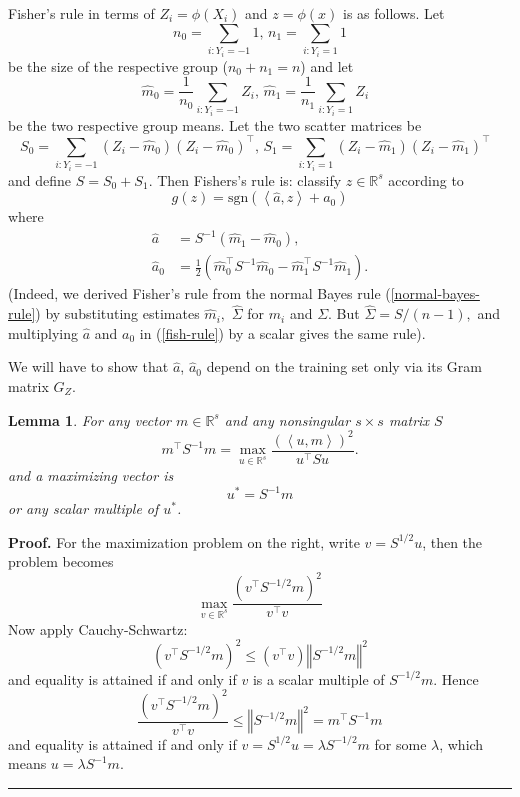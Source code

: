 \documentclass[11pt,twoside]{article}%
\theoremstyle{change}
\newtheorem{lemma}[theorem]{Lemma}
\newenvironment{proof}[1][Proof]{\textbf{#1.} }{\ \rule{0.5em}{0.5em}}
\begin{document}
Fisher's rule in terms of $Z_{i}=\phi\left(  X_{i}\right)  $ and
$z=\phi\left(  x\right)  $ is as follows. Let
\[
n_{0}=\sum_{i:Y_{i}=-1}1\text{,\ \ }n_{1}=\sum_{i:Y_{i}=1}1
\]
be the size of the respective group ($n_{0}+n_{1}=n$) and let
\[
\hat{m}_{0}=\frac{1}{n_{0}}\sum_{i:Y_{i}=-1}Z_{i}\text{,\ \ }\hat{m}_{1}%
=\frac{1}{n_{1}}\sum_{i:Y_{i}=1}Z_{i}\text{ }%
\]
be the two respective group means. Let the two scatter matrices be
\[
S_{0}=\sum_{i:Y_{i}=-1}\left(  Z_{i}-\hat{m}_{0}\right)  \left(  Z_{i}-\hat
{m}_{0}\right)  ^{\top}\text{,\ \ }S_{1}=\sum_{i:Y_{i}=1}\left(  Z_{i}-\hat
{m}_{1}\right)  \left(  Z_{i}-\hat{m}_{1}\right)  ^{\top}\text{ }%
\]
and define $S=S_{0}+S_{1}$. Then Fishers's rule is: classify $z\in
\mathbb{R}^{s}$ according to
\begin{equation}
g(z)=\mathrm{sgn}\left(  \left\langle \hat{a},z\right\rangle +a_{0}\right)
\label{fish-rule}%
\end{equation}
where
\begin{align*}
\hat{a}  & =S^{-1}\left(  \hat{m}_{1}-\hat{m}_{0}\right)  ,\\
\hat{a}_{0}  & =\frac{1}{2}\left(  \hat{m}_{0}^{\top}S^{-1}\hat{m}_{0}-\hat
{m}_{1}^{\top}S^{-1}\hat{m}_{1}\right)  .
\end{align*}
(Indeed, we derived Fisher's rule from the normal Bayes rule
(\ref{normal-bayes-rule}) by substituting estimates $\hat{m}_{i},$
$\hat{\Sigma}$ for $m_{i}$ and $\Sigma$. But $\hat{\Sigma}=S/(n-1),$ and
multiplying $\hat{a}$ and $a_{0}$ in (\ref{fish-rule}) by a scalar gives the
same rule).

We will have to show that $\hat{a}$, $\hat{a}_{0}$ depend on the training set
only via its Gram matrix $G_{Z}$.

\begin{lemma}
\label{lem-maxim-problem}For any vector $m\in\mathbb{R}^{s}$ and any
nonsingular $s\times s$ matrix $S$
\[
m^{\top}S^{-1}m=\max_{u\in\mathbb{R}^{s}}\frac{\left(  \left\langle
u,m\right\rangle \right)  ^{2}}{u^{\top}Su}.
\]
and a maximizing vector is
\[
u^{\ast}=S^{-1}m
\]
or any scalar multiple of $u^{\ast}$.
\end{lemma}

\begin{proof}
For the maximization problem on the right, write $v=S^{1/2}u$, then the
problem becomes%
\[
\max_{v\in\mathbb{R}^{s}}\frac{\left(  v^{\top}S^{-1/2}m\right)  ^{2}}%
{v^{\top}v}%
\]
Now apply Cauchy-Schwartz:
\[
\left(  v^{\top}S^{-1/2}m\right)  ^{2}\leq\left(  v^{\top}v\right)  \left\Vert
S^{-1/2}m\right\Vert ^{2}%
\]
and equality is attained if and only if $v$ is a scalar multiple of
$S^{-1/2}m$. Hence
\[
\frac{\left(  v^{\top}S^{-1/2}m\right)  ^{2}}{v^{\top}v}\leq\left\Vert
S^{-1/2}m\right\Vert ^{2}=m^{\top}S^{-1}m
\]
and equality is attained if and only if $v=S^{1/2}u=\lambda S^{-1/2}m$ for
some $\lambda$, which means $u=\lambda S^{-1}m$.
\end{proof}
\end{document}
